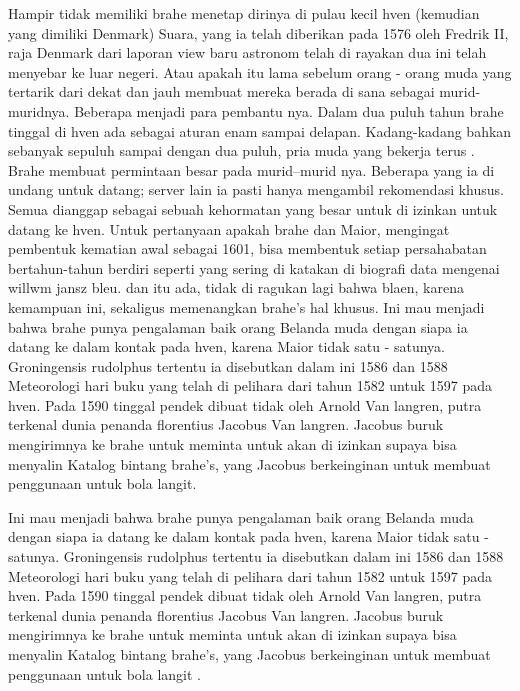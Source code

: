 Hampir tidak memiliki brahe menetap dirinya di pulau kecil hven (kemudian yang dimiliki Denmark) Suara, 
yang ia telah diberikan pada 1576 oleh Fredrik II, raja Denmark dari laporan view baru astronom telah di rayakan dua ini telah menyebar ke luar negeri. 
Atau apakah itu lama sebelum orang - orang muda yang tertarik dari dekat dan jauh membuat mereka berada di sana sebagai murid-muridnya. 
Beberapa menjadi para pembantu nya. Dalam dua puluh tahun brahe tinggal di hven ada sebagai aturan enam sampai delapan. 
Kadang-kadang bahkan sebanyak sepuluh sampai dengan dua puluh, pria muda yang bekerja terus . 
Brahe membuat permintaan besar pada murid–murid nya. Beberapa yang ia di undang untuk datang; server lain ia pasti hanya mengambil rekomendasi khusus. 
Semua dianggap sebagai sebuah kehormatan yang besar untuk di izinkan untuk datang ke hven. 
Untuk pertanyaan apakah brahe dan Maior, mengingat pembentuk kematian awal sebagai 1601, 
bisa membentuk setiap persahabatan bertahun-tahun berdiri seperti yang sering di katakan di biografi data mengenai willwm jansz bleu. 
dan itu ada, tidak di ragukan lagi bahwa blaen, karena kemampuan ini, sekaligus memenangkan brahe's hal khusus. 
Ini mau menjadi bahwa brahe punya pengalaman baik orang Belanda muda dengan siapa ia datang ke dalam kontak pada hven, 
karena Maior tidak satu - satunya. Groningensis rudolphus tertentu ia disebutkan dalam ini 1586 dan 1588 Meteorologi 
hari buku yang telah di pelihara dari tahun 1582 untuk 1597 pada hven. 
Pada 1590 tinggal pendek dibuat tidak oleh Arnold Van langren, 
putra terkenal dunia penanda florentius Jacobus Van langren. 
Jacobus buruk mengirimnya ke brahe untuk meminta untuk akan di izinkan supaya bisa menyalin Katalog bintang brahe's, 
yang Jacobus berkeinginan untuk membuat penggunaan untuk bola langit. 

Ini mau menjadi bahwa brahe punya pengalaman baik orang Belanda muda dengan siapa ia datang ke dalam kontak pada hven, 
karena Maior tidak satu - satunya. Groningensis rudolphus tertentu ia disebutkan dalam ini 1586 dan 1588 Meteorologi 
hari buku yang telah di pelihara dari tahun 1582 untuk 1597 pada hven. 
Pada 1590 tinggal pendek dibuat tidak oleh Arnold Van langren, 
putra terkenal dunia penanda florentius Jacobus Van langren. 
Jacobus buruk mengirimnya ke brahe untuk meminta untuk akan di izinkan supaya bisa menyalin Katalog bintang brahe's, 
yang Jacobus berkeinginan untuk membuat penggunaan untuk bola langit \cite{richter1939willem}.



